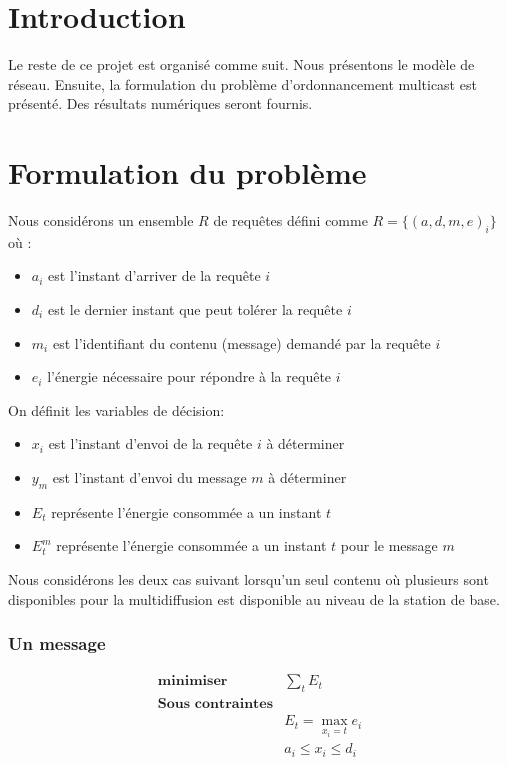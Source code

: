 \documentclass[runningheads]{llncs}
\begin{document}
\section{Introduction}
Le reste de ce projet est organis\'e comme suit. Nous présentons le modèle de réseau.
Ensuite, la formulation du problème d'ordonnancement multicast est pr\'esent\'e.
Des r\'esultats numériques seront fournis.
\section{Formulation du problème}
Nous considérons un ensemble $R$ de requêtes défini comme 
$R = \{(a, d, m, e )_i\} $ où :
\begin{itemize}
    \item $a_i$ est l'instant d'arriver de la requête $i$
    \item $d_i$ est le dernier instant que peut tolérer la requête $i$
    \item $m_i$ est l'identifiant du contenu (message) demandé par la requête  $i$
    \item $e_i$ l'énergie nécessaire pour répondre à la requête $i$
\end{itemize} 

On définit les variables de décision:
\begin{itemize}
    \item $x_i$ est l'instant d'envoi de la requête $i$ à  déterminer 
    \item $y_m$ est l'instant d'envoi du message  $m$ à  déterminer 
    \item $E_t$ représente l'énergie consommée a un instant $t$
    \item $E_t^m$ représente l'énergie consommée a un instant $t$ pour 
    le message $m$
\end{itemize}

Nous consid\'erons les deux cas suivant lorsqu'un seul contenu o\`u plusieurs 
sont disponibles pour la multidiffusion est disponible au niveau de la 
station de base.
\subsubsection{Un message}
\[
    \begin{array}{cc}
         \textbf{minimiser} &  \sum\limits_{t} E_t\\
         \textbf{Sous contraintes} & \\
         & E_t = \max\limits_{x_i=t} e_i \\
         & a_i \leq x_i \leq d_i\\
    \end{array}
\] 
\end{document}
